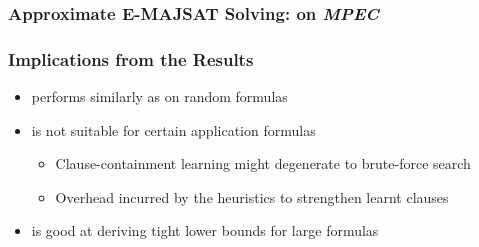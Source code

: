 \begin{frame}
    \frametitle{Approximate E-MAJSAT Solving: \erssatb on \textit{MPEC}}
    \begin{table}[ht]
        \centering
        \scriptsize
    \end{table}
\end{frame}

\begin{frame}
    \frametitle{Implications from the Results}
    \begin{itemize}
        \item \erssat performs similarly as \dcssat on random formulas
              \pause
        \item \erssat is not suitable for certain application formulas
              \pause
              \begin{itemize}
                  \item Clause-containment learning might degenerate to brute-force search
                        \pause
                  \item Overhead incurred by the heuristics to strengthen learnt clauses
                        \pause
              \end{itemize}
        \item \erssat is good at deriving tight lower bounds for large formulas
    \end{itemize}
\end{frame}